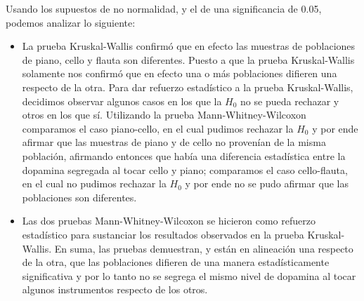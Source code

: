 
Usando los supuestos de no normalidad, y el de una significancia de 0.05, podemos analizar lo siguiente:
\begin{itemize}
    \item La prueba Kruskal-Wallis confirmó que en efecto las muestras de poblaciones de piano, cello y flauta son diferentes. Puesto a que la prueba Kruskal-Wallis solamente nos confirmó que en efecto una o más poblaciones difieren una respecto de la otra. Para dar refuerzo estadístico a la prueba Kruskal-Wallis, decidimos observar algunos casos en los que la $H_0$ no se pueda rechazar y otros en los que sí. Utilizando la prueba Mann-Whitney-Wilcoxon comparamos el caso piano-cello, en el cual pudimos rechazar la $H_0$ y por ende afirmar que las muestras de piano y de cello no provenían de la misma población, afirmando entonces que había una diferencia estadística entre la dopamina segregada al tocar cello y piano; comparamos el caso cello-flauta, en el cual no pudimos rechazar la $H_0$  y por ende no se pudo afirmar que las poblaciones son diferentes.
    \item Las dos pruebas Mann-Whitney-Wilcoxon se hicieron como refuerzo estadístico para sustanciar los resultados observados en la prueba Kruskal-Wallis. En suma, las pruebas demuestran, y están en alineación una respecto de la otra, que las poblaciones difieren de una manera estadísticamente significativa y por lo tanto no se segrega el mismo nivel de dopamina al tocar algunos instrumentos respecto de los otros.
\end{itemize}
